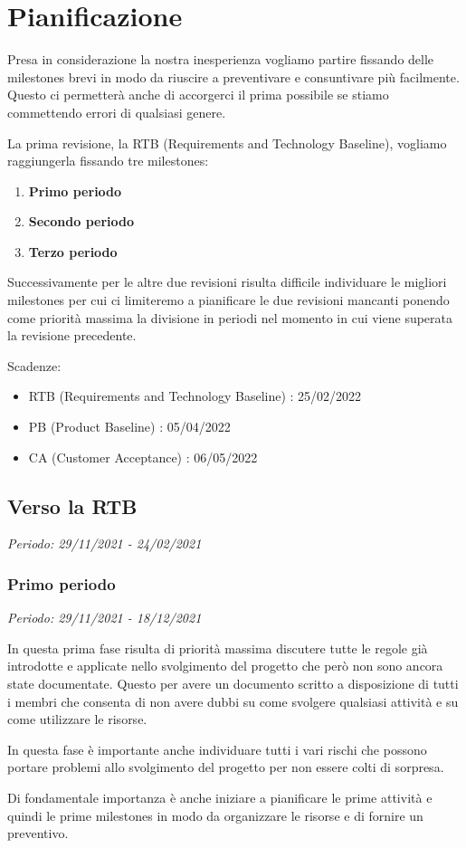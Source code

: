 \chapter{Pianificazione}

Presa in considerazione la nostra inesperienza vogliamo partire fissando delle milestones
brevi in modo da riuscire a preventivare e consuntivare più facilmente. Questo ci permetterà
anche di accorgerci il prima possibile se stiamo commettendo errori di qualsiasi genere.

La prima revisione, la RTB (Requirements and Technology Baseline), vogliamo raggiungerla fissando tre milestones:
\begin{enumerate}
    \item \textbf{Primo periodo}
    \item \textbf{Secondo periodo}
    \item \textbf{Terzo periodo}
\end{enumerate}

\noindent Successivamente per le altre due revisioni risulta difficile individuare le migliori
milestones per cui ci limiteremo a pianificare le due revisioni mancanti ponendo come priorità
massima la divisione in periodi nel momento in cui viene superata la revisione precedente.

Scadenze:
\begin{itemize}
    \item RTB (Requirements and Technology Baseline) : 25/02/2022
    \item PB (Product Baseline) : 05/04/2022
    \item CA (Customer Acceptance) : 06/05/2022
\end{itemize}

\newpage

\section{Verso la RTB}

\textit{Periodo: 29/11/2021 - 24/02/2021}

\subsection{Primo periodo}

\textit{Periodo: 29/11/2021 - 18/12/2021}

In questa prima fase risulta di priorità massima discutere tutte le regole già introdotte
e applicate nello svolgimento del progetto che però non sono ancora state documentate.
Questo per avere un documento scritto a disposizione di tutti i membri che consenta di
non avere dubbi su come svolgere qualsiasi attività e su come utilizzare le risorse.
\par In questa fase è importante anche individuare tutti i vari rischi che possono portare
problemi allo svolgimento del progetto per non essere colti di sorpresa.
\par Di fondamentale importanza è anche iniziare a pianificare le prime attività e quindi
le prime milestones in modo da organizzare le risorse e di fornire un preventivo. 

